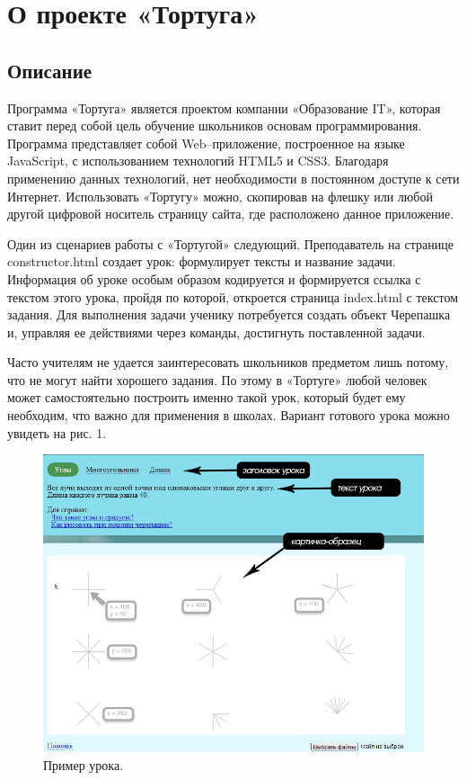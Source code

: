 \renewcommand{\chaptername}{Глава}
\chapter{О проекте «Тортуга»} \label{chapt1}

\section{Описание} \label{sect1_1}

Программа «Тортуга» является проектом компании «Образование IT», которая ставит перед собой цель обучение школьников основам программирования. Программа представляет собой Web–приложение, построенное на языке JavaScript, с использованием технологий HTML5 и CSS3. Благодаря применению данных технологий, нет необходимости в постоянном доступе к сети Интернет. Использовать «Тортугу» можно, скопировав на флешку или любой другой цифровой носитель страницу сайта, где расположено данное приложение.\par
Один из сценариев работы с «Тортугой» следующий. Преподаватель на странице constructor.html создает урок: формулирует тексты и название задачи. Информация об уроке особым образом кодируется и формируется ссылка с текстом этого урока, пройдя по которой, откроется страница index.html с текстом задания. Для выполнения задачи ученику потребуется создать объект Черепашка и, управляя ее действиями через команды, достигнуть поставленной задачи.\par
Часто учителям не удается заинтересовать школьников предметом лишь потому, что не могут найти хорошего задания. По этому в «Тортуге» любой человек может самостоятельно построить именно такой урок, который будет ему необходим, что важно для применения в школах. Вариант готового урока можно увидеть на рис. 1. 
\vspace{50mm}

\begin{figure} [h] 
  \center
  \includegraphics [scale=0.70,natwidth=826,natheight=645] {images/pic1.jpg}
  \caption{Пример урока.} 
  \label{img:pic1}  
\end{figure}


